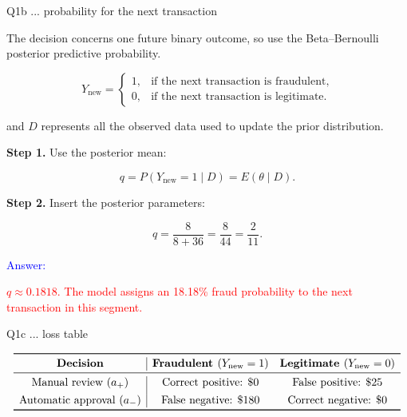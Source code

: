 \documentclass[aspectratio=43,10pt]{beamer}
\newcommand{\answer}[1]{\textcolor{red}{#1}}
\begin{document}

\begin{frame}{}
\begin{block}{Q1b ... probability for the next transaction}

  The decision concerns one future binary outcome, so use the
  Beta--Bernoulli posterior predictive probability.

  \[
  Y_{\mathrm{new}} =
  \begin{cases}
    1, & \text{if the next transaction is fraudulent},\\
    0, & \text{if the next transaction is legitimate}.
  \end{cases}
  \]

  and $D$ represents all the observed data used to update the prior
  distribution.
  
  \pause

  \textbf{Step 1.} Use the posterior mean:

  \[
  q=P(Y_{\mathrm{new}}=1\mid D)=E(\theta\mid D).
  \]
  
  \pause

  \textbf{Step 2.} Insert the posterior parameters:

  \[
  q=\frac{8}{8+36}=\frac{8}{44}=\frac{2}{11}.
  \]

  \textcolor{blue}{Answer:}

  \answer{
    $q\approx0.1818$.
    The model assigns an 18.18\% fraud probability to the next
    transaction in this segment.
  }

\end{block}
\end{frame}


\begin{frame}{}
\begin{block}{Q1c ... loss table}
  \small

  \[
  \begin{array}{c|cc}
    \toprule
    \textbf{Decision}
    &
    \textbf{Fraudulent }(Y_{\mathrm{new}}=1)
    &
    \textbf{Legitimate }(Y_{\mathrm{new}}=0)
    \\
    \midrule
    \text{Manual review }(a_+)
    &
    \text{Correct positive: } \$0
    &
    \text{False positive: } \$25
    \\[4pt]
    \text{Automatic approval }(a_-)
    &
    \text{False negative: } \$180
    &
    \text{Correct negative: } \$0
    \\
    \bottomrule
  \end{array}
  \]
\end{block}
\end{frame}
\end{document}
